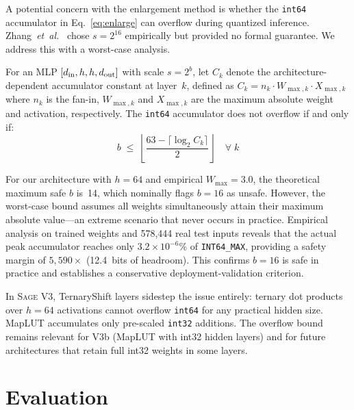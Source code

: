 \documentclass[sigconf,nonacm]{acmart}
\newcommand{\sys}{\textsc{Sage}\xspace}
\newcommand{\etal}{\textit{et~al.}\xspace}
\begin{document}
A potential concern with the enlargement method is whether the
\texttt{int64} accumulator in Eq.~\eqref{eq:enlarge} can overflow
during quantized inference.
Zhang~\etal~\cite{zhang2024dsn} chose $s = 2^{16}$ empirically but
provided no formal guarantee.
We address this with a worst-case analysis.

\begin{theorem}\label{thm:overflow}
For an MLP $[d_\textup{in}, h, h, d_\textup{out}]$ with scale
$s = 2^b$, let $C_k$ denote the architecture-dependent accumulator
constant at layer~$k$, defined as
$C_k = n_k \cdot W_{\max,k} \cdot X_{\max,k}$ where $n_k$ is the
fan-in, $W_{\max,k}$ and $X_{\max,k}$ are the maximum absolute weight
and activation, respectively.
The \texttt{int64} accumulator does not overflow if and only if:
\begin{equation}\label{eq:safe}
b \;\le\; \left\lfloor \frac{63 -
\lceil\log_2 C_k\rceil}{2} \right\rfloor \quad \forall\; k
\end{equation}
\end{theorem}

For our architecture with $h = 64$ and empirical
$W_\text{max} = 3.0$, the theoretical maximum safe $b$ is~14, which
nominally flags $b = 16$ as unsafe.
However, the worst-case bound assumes all weights simultaneously attain
their maximum absolute value---an extreme scenario that never occurs in
practice.
Empirical analysis on trained weights and 578{,}444 real test inputs
reveals that the actual peak accumulator reaches only
$3.2 \times 10^{-6}$\% of \texttt{INT64\_MAX}, providing a safety
margin of $5{,}590\times$ (12.4~bits of headroom).
This confirms $b = 16$ is safe in practice and establishes a
conservative deployment-validation criterion.

In \sys V3, TernaryShift layers sidestep the issue entirely: ternary
dot products over $h = 64$ activations cannot overflow \texttt{int64}
for any practical hidden size.
MapLUT accumulates only pre-scaled \texttt{int32} additions.
The overflow bound remains relevant for V3b (MapLUT with int32 hidden
layers) and for future architectures that retain full int32 weights in
some layers.


\section{Evaluation}\label{sec:eval}
\end{document}
